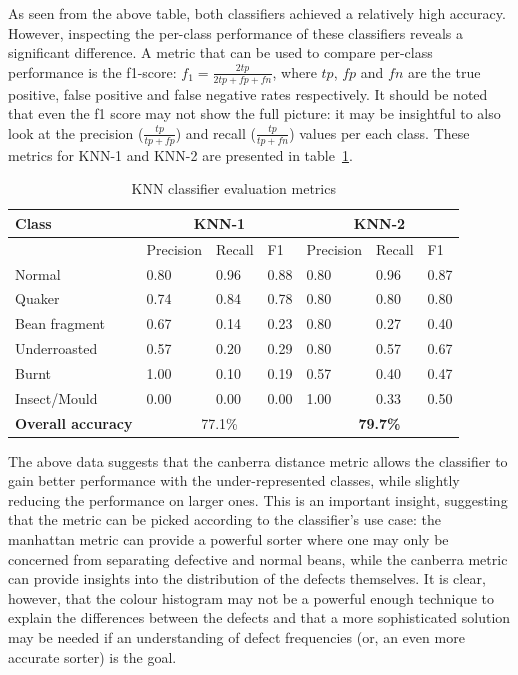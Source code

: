 As seen from the above table, both classifiers achieved a relatively high accuracy.
However, inspecting the per-class performance of these classifiers reveals a significant difference.
A metric that can be used to compare per-class performance is the f1-score:
$f_1 = \frac{2tp}{2tp + fp + fn}$, where $tp$, $fp$ and $fn$ are the true positive, false positive and false negative rates respectively.
It should be noted that even the f1 score may not show the full picture: it may be insightful to also look at the precision
($\frac{tp}{tp + fp}$) and recall ($\frac{tp}{tp + fn}$) values per each class.
These metrics for KNN-1 and KNN-2 are presented in table~\ref{tab:knnScores}.
\begin{table}
    \centering
    \begin{tabular}{*7l}
        \toprule
        \textbf{Class} & \multicolumn{3}{c}{KNN-1} & \multicolumn{3}{c}{KNN-2} \\
        \midrule
        {}            & Precision & Recall & F1   & Precision & Recall & F1   \\
        Normal        & 0.80      & 0.96   & 0.88 & 0.80      & 0.96   & 0.87 \\
        Quaker        & 0.74      & 0.84   & 0.78 & 0.80      & 0.80   & 0.80 \\
        Bean fragment & 0.67      & 0.14   & 0.23 & 0.80      & 0.27   & 0.40 \\
        Underroasted  & 0.57      & 0.20   & 0.29 & 0.80      & 0.57   & 0.67 \\
        Burnt         & 1.00      & 0.10   & 0.19 & 0.57      & 0.40   & 0.47 \\
        Insect/Mould  & 0.00      & 0.00   & 0.00 & 1.00      & 0.33   & 0.50 \\
        \midrule
        \textbf{Overall accuracy} & \multicolumn{3}{c}{77.1\%} & \multicolumn{3}{c}{\textbf{79.7\%}} \\
        \bottomrule
    \end{tabular}
    \caption{KNN classifier evaluation metrics}
    \label{tab:knnScores}
\end{table}

The above data suggests that the canberra distance metric allows the classifier to gain better
performance with the under-represented classes, while slightly reducing the performance on larger ones.
This is an important insight, suggesting that the metric can be picked according to the classifier's use case:
the manhattan metric can provide a powerful sorter where one may only be concerned from separating defective and normal beans,
while the canberra metric can provide insights into the distribution of the defects themselves.
It is clear, however, that the colour histogram may not be a powerful enough technique to explain the differences between
the defects and that a more sophisticated solution may be needed if an understanding of defect frequencies (or, an even more accurate sorter)
is the goal.


